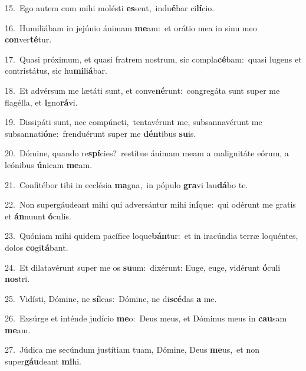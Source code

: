 {\numbfont\textcolor{\numbcolor}{15.}}~Ego autem cum mihi molésti \textbf{es}\-sent,~\star indu\-\textbf{é}\-bar ci\-\textbf{lí}\-cio.\par
{\numbfont\textcolor{\numbcolor}{16.}}~Humiliábam in jejúnio ánimam \textbf{me}\-am:~\star et orátio mea in sinu meo \textbf{con}\-ver\-\textbf{té}\-tur.\par
{\numbfont\textcolor{\numbcolor}{17.}}~Quasi próximum, et quasi fratrem nostrum, sic compla\-\textbf{cé}\-bam:~\star quasi lugens et contristátus, sic hu\-\textbf{mi}\-li\-\textbf{á}\-bar.\par
{\numbfont\textcolor{\numbcolor}{18.}}~Et advérsum me lætáti sunt, et conve\-\textbf{né}\-runt:~\star congregáta sunt super me flagélla, et \textbf{i}\-gno\-\textbf{rá}\-vi.\par
{\numbfont\textcolor{\numbcolor}{19.}}~Dissipáti sunt, nec compúncti,~\dagger tentavérunt me, subsannavérunt me subsannati\-\textbf{ó}\-ne:~\star frenduérunt super me \textbf{dén}\-tibus \textbf{su}\-is.\par
{\numbfont\textcolor{\numbcolor}{20.}}~Dómine, quando re\-\textbf{spí}\-cies?~\star restítue ánimam meam a malignitáte eórum, a leónibus \textbf{ú}\-nicam \textbf{me}\-am.\par
{\numbfont\textcolor{\numbcolor}{21.}}~Confitébor tibi in ecclésia \textbf{ma}\-gna,~\star in pópulo \textbf{gra}\-vi lau\-\textbf{dá}\-bo te.\par
{\numbfont\textcolor{\numbcolor}{22.}}~Non supergáudeant mihi qui adversántur mihi in\-\textbf{í}\-que:~\star qui odérunt me gratis et \textbf{án}\-nuunt \textbf{ó}\-culis.\par
{\numbfont\textcolor{\numbcolor}{23.}}~Quóniam mihi quidem pacífice loque\-\textbf{bán}\-tur:~\star et in iracúndia terræ loquéntes, dolos \textbf{co}\-gi\-\textbf{tá}\-bant.\par
{\numbfont\textcolor{\numbcolor}{24.}}~Et dilatavérunt super me os \textbf{su}\-um:~\star dixérunt: Euge, euge, vidérunt \textbf{ó}\-culi \textbf{nos}\-tri.\par
{\numbfont\textcolor{\numbcolor}{25.}}~Vidísti, Dómine, ne \textbf{sí}\-leas:~\star Dómine, ne di\-\textbf{scé}\-das \textbf{a} me.\par
{\numbfont\textcolor{\numbcolor}{26.}}~Exsúrge et inténde judício \textbf{me}\-o:~\star Deus meus, et Dóminus meus in \textbf{cau}\-sam \textbf{me}\-am.\par
{\numbfont\textcolor{\numbcolor}{27.}}~Júdica me secúndum justítiam tuam, Dómine, Deus \textbf{me}\-us,~\star et non super\-\textbf{gáu}\-deant \textbf{mi}\-hi.\par
